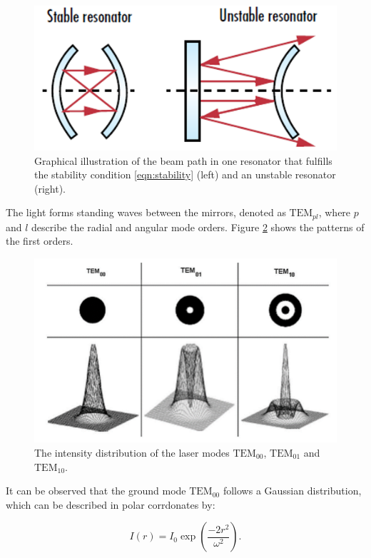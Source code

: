 \begin{figure}[H]
    \centering
    \includegraphics[scale=0.5]{pictures/resonator.png} %
    \caption{Graphical illustration of the beam path in one resonator that fulfills the stability condition \eqref{eqn:stability} (left) and an unstable resonator (right). \cite{resonator}}
    \label{fig:resonator}
\end{figure}

The light forms standing waves between the mirrors, denoted as $\text{TEM}_{pl}$,
where $p$ and $l$ describe the radial and angular mode orders. Figure 
\ref{fig:TEM} shows the patterns of the first orders.

\begin{figure}[H]
    \centering
    \includegraphics[scale=0.3]{pictures/modes.png} %
    \caption{The intensity distribution of the laser modes $\text{TEM}_{00}$, $\text{TEM}_{01}$ and $\text{TEM}_{10}$. \cite{TEM}}
    \label{fig:TEM}
\end{figure}

It can be observed that the ground mode $\text{TEM}_{00}$ follows a 
Gaussian distribution, which can be described in polar corrdonates by:

\begin{equation}
    I(r)=I_0 \exp{\left(\frac{-2r^2}{\omega^2}\right)}.
\end{equation}

